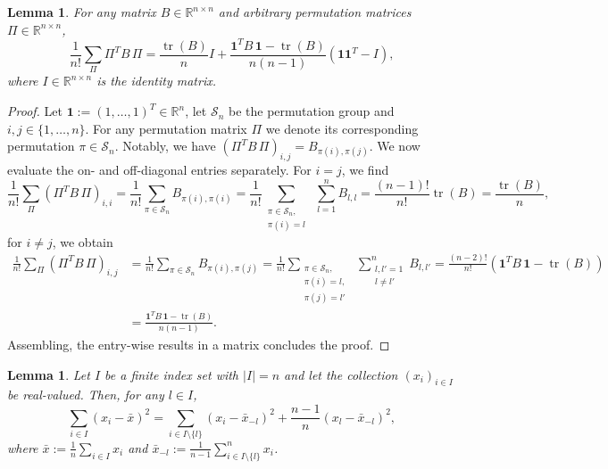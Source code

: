 \documentclass[aos]{imsart2}
\theoremstyle{plain}
\newtheorem{lemma}[theorem]{Lemma}
\theoremstyle{definition}
\newcommand{\one}{\mathbf{1}}
\newcommand{\R}{\mathbb{R}}
\newcommand{\xbs}{\bar{x}}
\DeclareMathOperator{\tr}{tr}
\begin{document}
\begin{appendix}
\begin{lemma}\label{lem:perm-avg}
    For any matrix $B \in \R^{n\times n}$ and arbitrary permutation matrices $\Pi \in \R^{n\times n}$,
    \begin{equation*}
        \frac{1}{n!} \sum_{\Pi} \Pi^T B\, \Pi = \frac{\tr(B)}{n} I +\frac{\one^TB\,\one-\tr(B)}{n(n-1)}(\one\one^T-I),
    \end{equation*}
    where $I \in \R^{n\times n}$ is the identity matrix.
\end{lemma}
\begin{proof}
    Let $\one:=(1,\ldots,1)^T\in \R^n$, let $\mathcal{S}_n$ be the permutation group and $i,j\in\{1,\ldots,n\}$. For any permutation matrix $\Pi$ we denote its corresponding permutation $\pi \in \mathcal{S}_n$. Notably, we have $(\Pi^T B\, \Pi)_{i,j} = B_{\pi(i),\pi(j)}$. We now evaluate the on- and off-diagonal entries separately. For $i=j$, we find
    \begin{equation*}
        \frac{1}{n!}\sum_\Pi (\Pi^T B\, \Pi)_{i,i}  = \frac{1}{n!}\sum_{\pi\in \mathcal{S}_n} B_{\pi(i),\pi(i)}= \frac{1}{n!} \sum_{\substack{\pi\in\mathcal{S}_n,\\\pi(i)=l}}\,\, \sum_{l=1}^n B_{l,l} = \frac{(n-1)!}{n!} \tr(B) = \frac{\tr(B)}{n},
    \end{equation*}
    for $i\neq j$, we obtain
    \begin{align*}
        \frac{1}{n!}\sum_\Pi (\Pi^T B\, \Pi)_{i,j}  &= \frac{1}{n!}\sum_{\pi\in \mathcal{S}_n} B_{\pi(i),\pi(j)}= \frac{1}{n!} \sum_{\substack{\pi\in\mathcal{S}_n,\\\pi(i)=l,\\\pi(j)=l'}}\,\, \sum_{\substack{l,l'=1\\ l\neq l'}}^n B_{l,l'} = \frac{(n-2)!}{n!} (\one^T B\, \one - \tr(B))\\[-2ex]
        &=\frac{\one^TB\,\one-\tr(B)}{n(n-1)}.
    \end{align*}
    Assembling, the entry-wise results in a matrix concludes the proof.
\end{proof}

\begin{lemma}\label{lem:emp-mean-perturb}
    Let $I$ be a finite index set with $\lvert I \rvert=n$ and let the collection $(x_i)_{i\in I}$ be real-valued. Then, for any $l \in I$,
	\begin{equation*}
		\sum_{i \in I} (x_i - \xbs)^2 = \sum_{i \in I \setminus\{l\}} (x_i - \xbs_{-l})^2 + \frac{n-1}{n} (x_l - \xbs_{-l})^2,
	\end{equation*}
	where $\xbs:=\frac{1}{n}\sum_{i\in I} x_i$ and $\xbs_{-l}:=\frac{1}{n-1}\sum_{i \in I \setminus\{l\}}^n x_i$.
\end{lemma}


\end{appendix}
\end{document}
